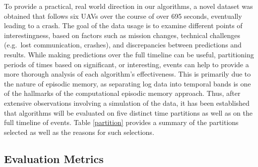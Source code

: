 \documentclass[12pt]{uthesis-v12}  %
\begin{document}
To provide a practical, real world direction in our algorithms, a novel dataset was obtained that follows six UAVs over the course of over 695 seconds, eventually leading to a crash. The goal of the data usage is to examine different points of interestingness, based on factors such as mission changes, technical challenges (e.g.~lost communication, crashes), and discrepancies between predictions and results. While making predictions over the full timeline can be useful, partitioning periods of times based on significant, or interesting, events can help to provide a more thorough analysis of each algorithm's effectiveness. This is primarily due to the nature of episodic memory, as separating log data into temporal bands is one of the hallmarks of the computational episodic memory approach. Thus, after extensive observations involving a simulation of the data, it has been established that algorithms will be evaluated on five distinct time partitions as well as on the full timeline of events. Table \ref{partition} provides a summary of the partitions selected as well as the reasons for such selections.

\subsection{Evaluation Metrics}
\label{metrics}
\end{document}
